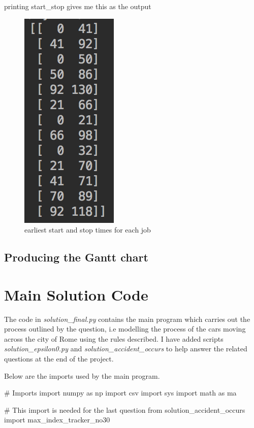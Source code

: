 \documentclass[paper=a4, fontsize=12pt]{scrartcl} %
\numberwithin{equation}{section}       %
\numberwithin{figure}{section}         %
\numberwithin{table}{section}          %
\begin{document}
printing start\_stop gives me this as the output

\begin{figure}[h]
\caption{earliest start and stop times for each job}
\centering
\includegraphics[scale=0.8]{lists}
\end{figure}

\subsection{Producing the Gantt chart}

\newpage
\section{Main Solution Code}

The code in \textit{solution\_final.py} contains the main program which carries out the process outlined by the question, i.e modelling the process of the cars moving across the city of Rome using the rules described. I have added scripts \textit{solution\_epsilon0.py} and \textit{solution\_accident\_occurs} to help answer the related questions at the end of the project.
\newline

Below are the imports used by the main program.

\begin{python}
# Imports
import numpy as np
import csv
import sys
import math as ma

# This import is needed for the last question
from solution_accident_occurs import max_index_tracker_no30
\end{python}
\end{document}
